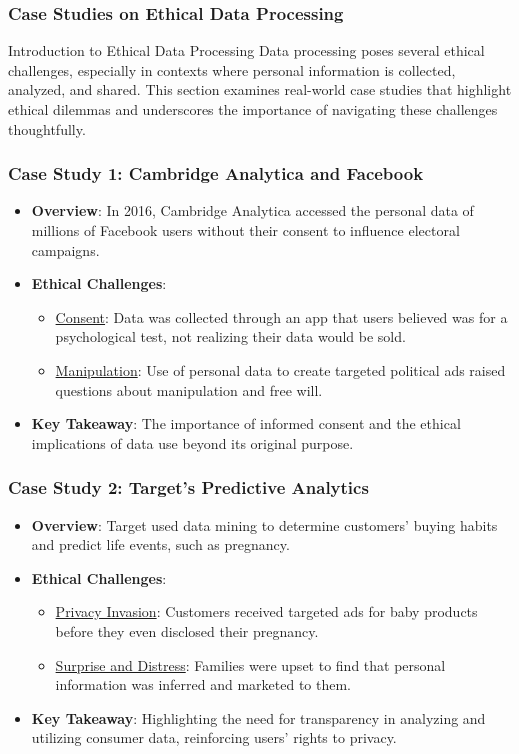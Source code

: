 \documentclass{beamer}
\begin{document}
\begin{frame}[fragile]
    \frametitle{Case Studies on Ethical Data Processing}
    \begin{block}{Introduction to Ethical Data Processing}
        Data processing poses several ethical challenges, especially in contexts where personal information is collected, analyzed, and shared. This section examines real-world case studies that highlight ethical dilemmas and underscores the importance of navigating these challenges thoughtfully.
    \end{block}
\end{frame}

\begin{frame}[fragile]
    \frametitle{Case Study 1: Cambridge Analytica and Facebook}
    \begin{itemize}
        \item \textbf{Overview}: In 2016, Cambridge Analytica accessed the personal data of millions of Facebook users without their consent to influence electoral campaigns.
        \item \textbf{Ethical Challenges}:
        \begin{itemize}
            \item \underline{Consent}: Data was collected through an app that users believed was for a psychological test, not realizing their data would be sold.
            \item \underline{Manipulation}: Use of personal data to create targeted political ads raised questions about manipulation and free will.
        \end{itemize}
        \item \textbf{Key Takeaway}: The importance of informed consent and the ethical implications of data use beyond its original purpose.
    \end{itemize}
\end{frame}

\begin{frame}[fragile]
    \frametitle{Case Study 2: Target's Predictive Analytics}
    \begin{itemize}
        \item \textbf{Overview}: Target used data mining to determine customers' buying habits and predict life events, such as pregnancy.
        \item \textbf{Ethical Challenges}:
        \begin{itemize}
            \item \underline{Privacy Invasion}: Customers received targeted ads for baby products before they even disclosed their pregnancy.
            \item \underline{Surprise and Distress}: Families were upset to find that personal information was inferred and marketed to them.
        \end{itemize}
        \item \textbf{Key Takeaway}: Highlighting the need for transparency in analyzing and utilizing consumer data, reinforcing users' rights to privacy.
    \end{itemize}
\end{frame}
\end{document}
